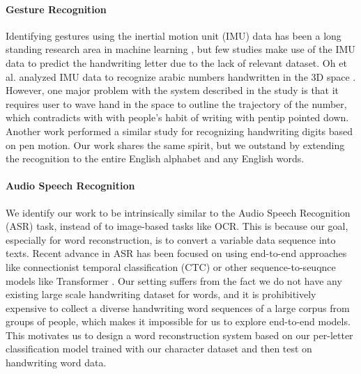 \documentclass{article}
\begin{document}
\begin{multicols*}{2}
\paragraph{Gesture Recognition} Identifying gestures using the inertial motion unit (IMU) data has been a long standing research area in machine learning \cite{Kim_2019, ganguly2018kinect, 7418327, 6470686, 6208895}, but few studies make use of the IMU data to predict the handwriting letter due to the lack of relevant dataset. Oh et al. analyzed IMU data to recognize arabic numbers handwritten in the 3D space \cite{1363896}. However, one major problem with the system described in the study is that it requires user to wave hand in the space to outline the trajectory of the number, which contradicts with with people's habit of writing with pentip pointed down. Another work \cite{bib1} performed a similar study for recognizing handwriting digits based on pen motion. Our work shares the same spirit, but we outstand by extending the recognition to the entire English alphabet and any English words.

\paragraph{Audio Speech Recognition} We identify our work to be intrinsically similar to the Audio Speech Recognition (ASR) task, instead of to image-based tasks like OCR. This is because our goal, especially for word reconstruction, is to convert a variable data sequence into texts. Recent advance \cite{yoshimura2020end, chiu2018state, moritz2020streaming, chang2020end} in ASR has been focused on using end-to-end approaches like connectionist temporal classification (CTC) \cite{yoshimura2020end} or other sequence-to-seuqnce models like Transformer \cite{moritz2020streaming, chang2020end}. Our setting suffers from the fact we do not have any existing large scale handwriting dataset for words, and it is prohibitively expensive to collect a diverse handwriting word sequences of a large corpus from groups of people, which makes it impossible for us to explore end-to-end models. This motivates us to design a word reconstruction system based on our per-letter classification model trained with our character dataset and then test on handwriting word data.



\end{multicols*}
\end{document}
